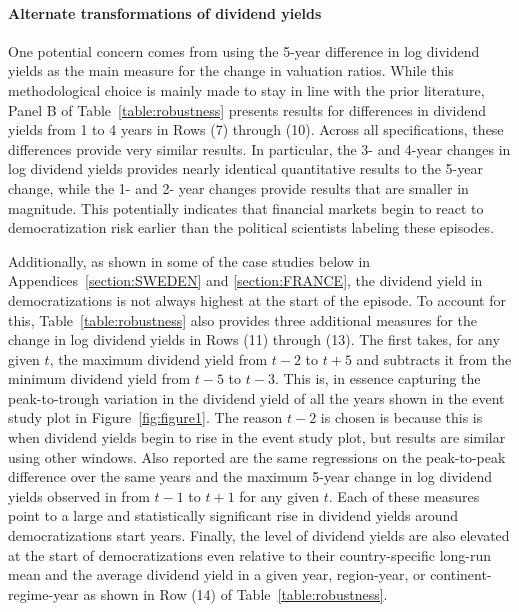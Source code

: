 \paragraph{Alternate transformations of dividend yields}
One potential concern comes from using the 5-year difference in log dividend yields as the main measure for the change in valuation ratios. While this methodological choice is mainly made to stay in line with the prior literature, Panel B of Table~\ref{table:robustness} presents results for differences in dividend yields from 1 to 4 years in Rows (7) through (10). Across all specifications, these differences provide very similar results. In particular, the 3- and 4-year changes in log dividend yields provides nearly identical quantitative results to the 5-year change, while the 1- and 2- year changes provide results that are smaller in magnitude. This potentially indicates that financial markets begin to react to democratization risk earlier than the political scientists labeling these episodes.

Additionally, as shown in some of the case studies below in Appendices~\ref{section:SWEDEN} and \ref{section:FRANCE}, the dividend yield in democratizations is not always highest at the start of the episode. To account for this, Table~\ref{table:robustness} also provides three additional measures for the change in log dividend yields in Rows (11) through (13). The first takes, for any given $t$, the maximum dividend yield from $t-2$ to $t+5$ and subtracts it from the minimum dividend yield from $t-5$ to $t-3$. This is, in essence capturing the peak-to-trough variation in the dividend yield of all the years shown in the event study plot in Figure~\ref{fig:figure1}.  The reason $t-2$ is chosen is because this is when dividend yields begin to rise in the event study plot, but results are similar using other windows. Also reported are the same regressions on the peak-to-peak difference over the same years and the maximum 5-year change in log dividend yields observed in from $t-1$ to $t+1$ for any given $t$. Each of these measures point to a large and statistically significant rise in dividend yields around democratizations start years.  Finally, the level of dividend yields are also elevated at the start of democratizations even relative to their country-specific long-run mean and the average dividend yield in a given year, region-year, or continent-regime-year as shown in Row (14) of Table~\ref{table:robustness}.


